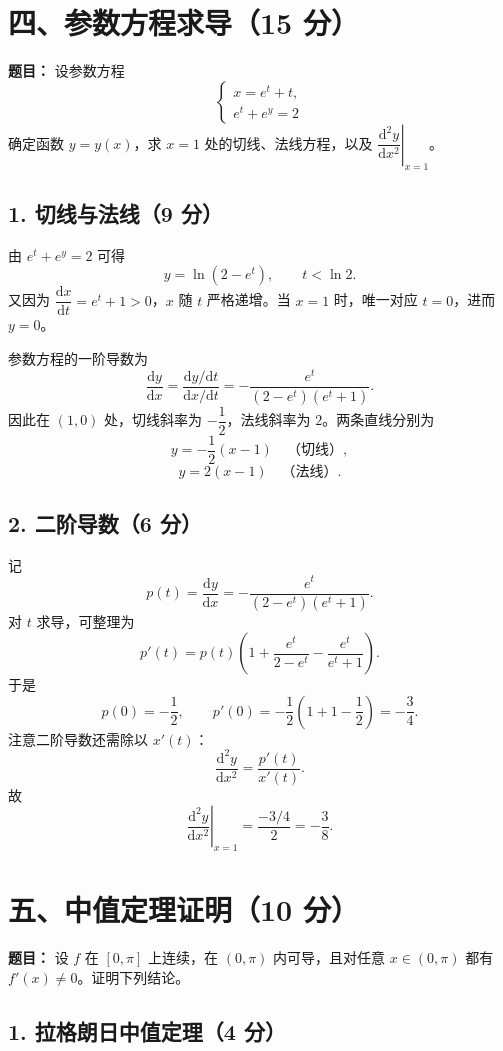\documentclass[UTF8,a4paper,11pt,fontset=fandol]{ctexart}
\begin{document}
\section*{四、参数方程求导（15 分）}

\textbf{题目：} 设参数方程
\[
\begin{cases}
x=e^t+t,\\
e^t+e^y=2
\end{cases}
\]
确定函数 $y=y(x)$，求 $x=1$ 处的切线、法线方程，以及 $\left.\dfrac{\mathrm{d}^2y}{\mathrm{d}x^2}\right|_{x=1}$。

\subsection*{1. 切线与法线（9 分）}

由 $e^t+e^y=2$ 可得
\[
y=\ln(2-e^t),\qquad t<\ln2.
\]
又因为 $\dfrac{\mathrm{d}x}{\mathrm{d}t}=e^t+1>0$，$x$ 随 $t$ 严格递增。当 $x=1$ 时，唯一对应 $t=0$，进而 $y=0$。

参数方程的一阶导数为
\[
\frac{\mathrm{d}y}{\mathrm{d}x}
=\frac{\mathrm{d}y/\mathrm{d}t}{\mathrm{d}x/\mathrm{d}t}
=-\frac{e^t}{(2-e^t)(e^t+1)}.
\]
因此在 $(1,0)$ 处，切线斜率为 $-\dfrac12$，法线斜率为 $2$。两条直线分别为
\[
\boxed{y=-\frac12(x-1)}\quad\text{（切线）},
\]
\[
\boxed{y=2(x-1)}\quad\text{（法线）}.
\]

\subsection*{2. 二阶导数（6 分）}

记
\[
p(t)=\frac{\mathrm{d}y}{\mathrm{d}x}
=-\frac{e^t}{(2-e^t)(e^t+1)}.
\]
对 $t$ 求导，可整理为
\[
p'(t)=p(t)\left(1+\frac{e^t}{2-e^t}-\frac{e^t}{e^t+1}\right).
\]
于是
\[
p(0)=-\frac12,\qquad
p'(0)=-\frac12\left(1+1-\frac12\right)=-\frac34.
\]
注意二阶导数还需除以 $x'(t)$：
\[
\frac{\mathrm{d}^2y}{\mathrm{d}x^2}
=\frac{p'(t)}{x'(t)}.
\]
故
\[
\boxed{\left.\frac{\mathrm{d}^2y}{\mathrm{d}x^2}\right|_{x=1}
=\frac{-3/4}{2}=-\frac38}.
\]

\section*{五、中值定理证明（10 分）}

\textbf{题目：} 设 $f$ 在 $[0,\pi]$ 上连续，在 $(0,\pi)$ 内可导，且对任意 $x\in(0,\pi)$ 都有 $f'(x)\ne0$。证明下列结论。

\subsection*{1. 拉格朗日中值定理（4 分）}
\end{document}
